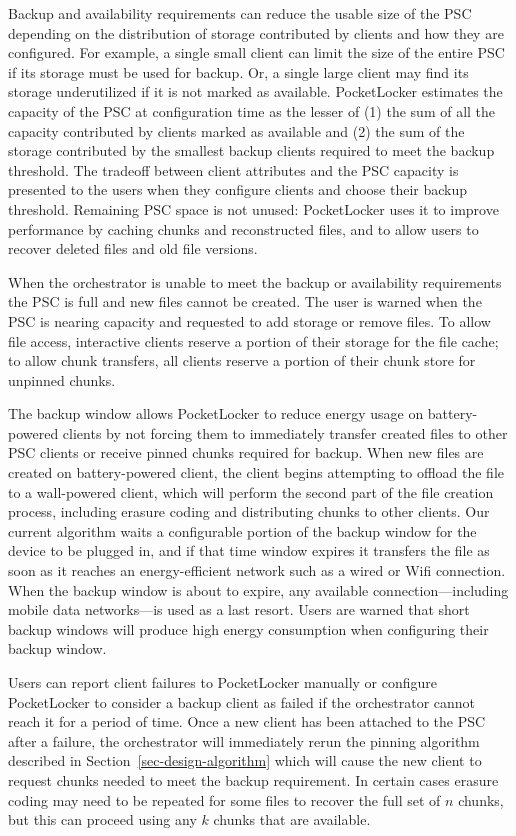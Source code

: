Backup and availability requirements can reduce the usable size of the PSC
depending on the distribution of storage contributed by clients and how they
are configured. For example, a single small client can limit the size of the
entire PSC if its storage must be used for backup. Or, a single large client
may find its storage underutilized if it is not marked as available.
PocketLocker estimates the capacity of the PSC at configuration time as the
lesser of (1) the sum of all the capacity contributed by clients marked as
available and (2) the sum of the storage contributed by the smallest backup
clients required to meet the backup threshold. The tradeoff between client
attributes and the PSC capacity is presented to the users when they configure
clients and choose their backup threshold. Remaining PSC space is not unused:
PocketLocker uses it to improve performance by caching chunks and
reconstructed files, and to allow users to recover deleted files and old file
versions.

When the orchestrator is unable to meet the backup or availability
requirements the PSC is full and new files cannot be created. The user is
warned when the PSC is nearing capacity and requested to add storage or
remove files. To allow file access, interactive clients reserve a portion of
their storage for the file cache; to allow chunk transfers, all clients
reserve a portion of their chunk store for unpinned chunks.

The backup window allows PocketLocker to reduce energy usage on
battery-powered clients by not forcing them to immediately transfer created
files to other PSC clients or receive pinned chunks required for backup. When
new files are created on battery-powered client, the client begins attempting
to offload the file to a wall-powered client, which will perform the second
part of the file creation process, including erasure coding and distributing
chunks to other clients. Our current algorithm waits a configurable portion
of the backup window for the device to be plugged in, and if that time window
expires it transfers the file as soon as it reaches an energy-efficient
network such as a wired or Wifi connection. When the backup window is about
to expire, any available connection---including mobile data networks---is used
as a last resort. Users are warned that short backup windows will produce
high energy consumption when configuring their backup window.

Users can report client failures to PocketLocker manually or configure
PocketLocker to consider a backup client as failed if the orchestrator cannot
reach it for a period of time. Once a new client has been attached to the PSC
after a failure, the orchestrator will immediately rerun the pinning
algorithm described in Section~\ref{sec-design-algorithm} which will cause
the new client to request chunks needed to meet the backup requirement. In
certain cases erasure coding may need to be repeated for some files to
recover the full set of $n$ chunks, but this can proceed using any $k$ chunks
that are available.

